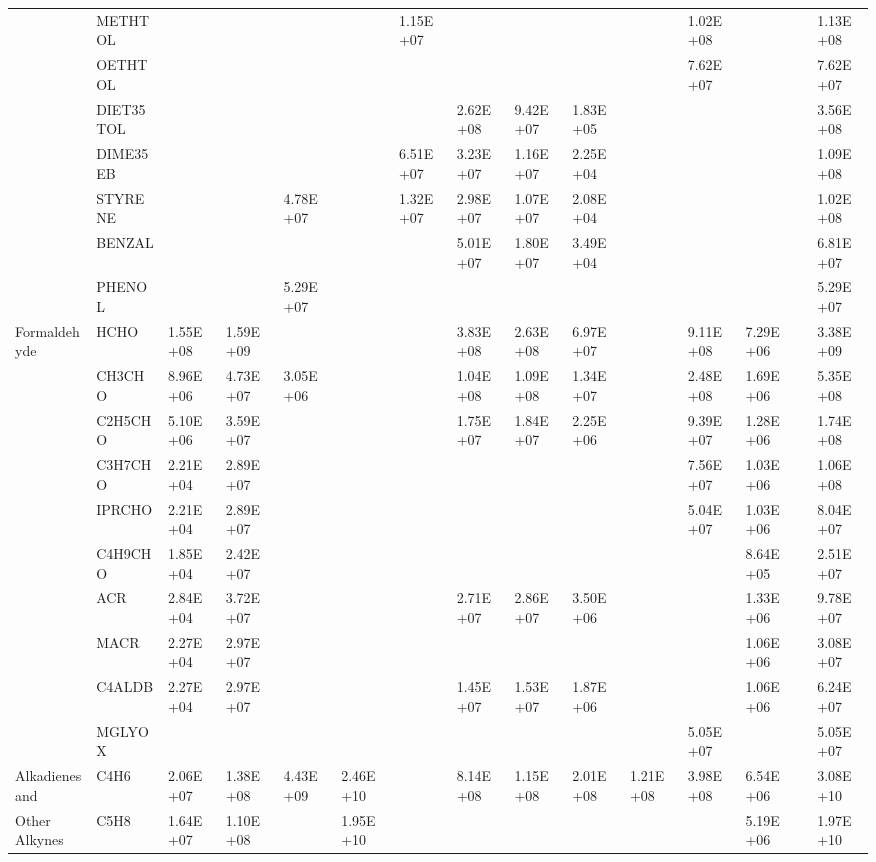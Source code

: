 \begin{longtable}{lllllllllllllll}
	 & METHTOL &  &  &  &  & 1.15E+07 &  &  &  &  & 1.02E+08 &  &  & 1.13E+08 \\
	 & OETHTOL &  &  &  &  &  &  &  &  &  & 7.62E+07 &  &  & 7.62E+07 \\
	 & DIET35TOL &  &  &  &  &  & 2.62E+08 & 9.42E+07 & 1.83E+05 &  &  &  &  & 3.56E+08 \\
	 & DIME35EB &  &  &  &  & 6.51E+07 & 3.23E+07 & 1.16E+07 & 2.25E+04 &  &  &  &  & 1.09E+08 \\
	 & STYRENE &  &  & 4.78E+07 &  & 1.32E+07 & 2.98E+07 & 1.07E+07 & 2.08E+04 &  &  &  &  & 1.02E+08 \\
	 & BENZAL &  &  &  &  &  & 5.01E+07 & 1.80E+07 & 3.49E+04 &  &  &  &  & 6.81E+07 \\
	 & PHENOL &  &  & 5.29E+07 &  &  &  &  &  &  &  &  &  & 5.29E+07 \\
	\hline Formaldehyde & HCHO & 1.55E+08 & 1.59E+09 &  &  &  & 3.83E+08 & 2.63E+08 & 6.97E+07 &  & 9.11E+08 & 7.29E+06 &  & 3.38E+09 \\ \hline
	\parbox[t]{2mm}{} & CH3CHO & 8.96E+06 & 4.73E+07 & 3.05E+06 &  &  & 1.04E+08 & 1.09E+08 & 1.34E+07 &  & 2.48E+08 & 1.69E+06 &  & 5.35E+08 \\
	 & C2H5CHO & 5.10E+06 & 3.59E+07 &  &  &  & 1.75E+07 & 1.84E+07 & 2.25E+06 &  & 9.39E+07 & 1.28E+06 &  & 1.74E+08 \\
	 & C3H7CHO & 2.21E+04 & 2.89E+07 &  &  &  &  &  &  &  & 7.56E+07 & 1.03E+06 &  & 1.06E+08 \\
	 & IPRCHO & 2.21E+04 & 2.89E+07 &  &  &  &  &  &  &  & 5.04E+07 & 1.03E+06 &  & 8.04E+07 \\
	 & C4H9CHO & 1.85E+04 & 2.42E+07 &  &  &  &  &  &  &  &  & 8.64E+05 &  & 2.51E+07 \\
	 & ACR & 2.84E+04 & 3.72E+07 &  &  &  & 2.71E+07 & 2.86E+07 & 3.50E+06 &  &  & 1.33E+06 &  & 9.78E+07 \\
	 & MACR & 2.27E+04 & 2.97E+07 &  &  &  &  &  &  &  &  & 1.06E+06 &  & 3.08E+07 \\
	 & C4ALDB & 2.27E+04 & 2.97E+07 &  &  &  & 1.45E+07 & 1.53E+07 & 1.87E+06 &  &  & 1.06E+06 &  & 6.24E+07 \\
	 & MGLYOX &  &  &  &  &  &  &  &  &  & 5.05E+07 &  &  & 5.05E+07 \\
	\hline Alkadienes and & C4H6 & 2.06E+07 & 1.38E+08 & 4.43E+09 & 2.46E+10 &  & 8.14E+08 & 1.15E+08 & 2.01E+08 & 1.21E+08 & 3.98E+08 & 6.54E+06 &  & 3.08E+10 \\
	Other Alkynes & C5H8 & 1.64E+07 & 1.10E+08 &  & 1.95E+10 &  &  &  &  &  &  & 5.19E+06 &  & 1.97E+10 \\

\end{longtable}
